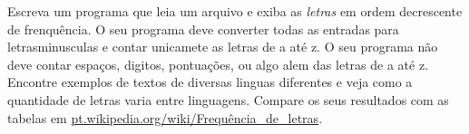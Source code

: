 \begin{ex}
Escreva um programa que leia um arquivo e
exiba as {\em letras} em ordem decrescente de frenquência. O seu programa 
deve converter todas as entradas para letrasminusculas e contar unicamete as 
letras de a até z. O seu programa não deve contar espaços, digitos, pontuações,
ou algo alem das letras de a até z.
Encontre exemplos de textos de diversas linguas diferentes e veja como a quantidade
de letras varia entre linguagens. Compare os seus resultados com as tabelas em
\url{pt.wikipedia.org/wiki/Frequência_de_letras}.


\end{ex}

